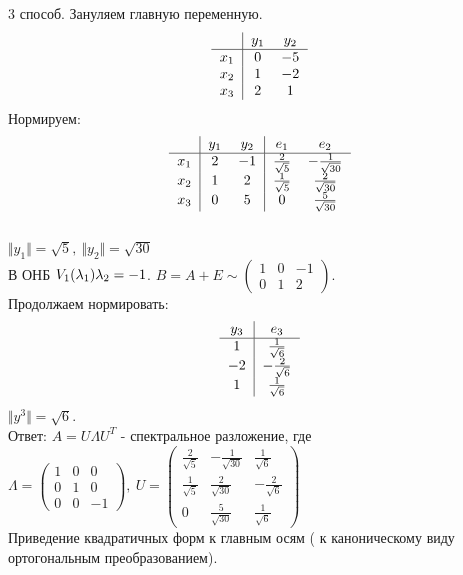\documentclass[12pt, letterpaper, twoside]{article}
\begin{document}
3 способ. Зануляем главную переменную.
\[\begin{tabular}{c | c c}
    & $y_1$ & $y_2$\\
    \hline
    $x_1$ & $0$ & $-5$\\
    $x_2$ & $1$ & $-2$\\
    $x_3$ & $2$ & $1$    
\end{tabular}\]
Нормируем:
\[\begin{tabular}{c | c c | c c}
    & $y_1$ & $y_2$ & $e_1$ & $e_2$\\
    \hline
    $x_1$ & $2$ & $-1$ & $\frac{2}{\sqrt{5}}$ & $-\frac{1}{\sqrt{30}}$\\
    $x_2$ & $1$ & $2$ & $\frac{1}{\sqrt{5}}$ & $\frac{2}{\sqrt{30}}$\\
    $x_3$ & $0$ & $5$ & $0$ & $\frac{5}{\sqrt{30}}$    
\end{tabular}\]\\
$\Vert y_1\Vert = \sqrt{5},\ \Vert y_2 \Vert = \sqrt{30}$\\
В ОНБ $V_1(\lambda_1)\\
\lambda_2 = -1$. $B = A + E\sim \begin{pmatrix}
    1 & 0 & -1\\
    0 & 1 & 2
\end{pmatrix}$.\\
Продолжаем нормировать:
\[\begin{tabular}{c | c}
    $y_3$ & $e_3$\\
    \hline
    $1$ & $\frac{1}{\sqrt{6}}$\\
    $-2$ & $-\frac{2}{\sqrt{6}}$\\
    $1$ & $\frac{1}{\sqrt{6}}$ 
\end{tabular}\]
$\Vert y^3 \Vert = \sqrt{6}$.\\
Ответ: $A = U\Lambda U^T$ - спектральное разложение, где $\Lambda = \begin{pmatrix}
    1 & 0 & 0\\
    0 & 1 & 0\\
    0 & 0 & -1
\end{pmatrix},\ U = \begin{pmatrix}
    \frac{2}{\sqrt{5}} & -\frac{1}{\sqrt{30}} & \frac{1}{\sqrt{6}}\\
    \frac{1}{\sqrt{5}} & \frac{2}{\sqrt{30}} & -\frac{2}{\sqrt{6}}\\
    0 & \frac{5}{\sqrt{30}} & \frac{1}{\sqrt{6}}
\end{pmatrix}$\\
Приведение квадратичных форм к главным осям ( к каноническому виду ортогональным преобразованием).
\end{document}
